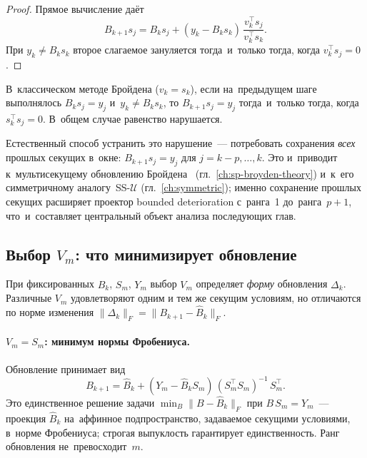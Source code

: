 \begin{proof}
Прямое вычисление даёт
\[
  B_{k+1} s_j
  = B_k s_j + (y_k - B_k s_k)\,\frac{v_k^\top s_j}{v_k^\top s_k}.
\]
При $y_k \neq B_k s_k$ второе слагаемое зануляется тогда~и~только тогда,
когда $v_k^\top s_j = 0$.
\end{proof}

\begin{corollary}\label{cor:broyden_destruction}
В~классическом методе Бройдена ($v_k = s_k$), если на~предыдущем шаге
выполнялось $B_k s_j = y_j$ и~$y_k \neq B_k s_k$, то $B_{k+1} s_j = y_j$
тогда~и~только тогда, когда $s_k^\top s_j = 0$. В~общем случае равенство нарушается.
\end{corollary}

Естественный способ устранить это нарушение~--- потребовать сохранения
\emph{всех} прошлых секущих в~окне: $B_{k+1} s_j = y_j$ для
$j=k{-}p,\ldots,k$. Это и~приводит к~мультисекущему обновлению
Бройдена~\cite{schnabel1983} (гл.~\ref{ch:sp-broyden-theory}) и~к~его
симметричному аналогу~SS-$\mathcal{U}$ (гл.~\ref{ch:symmetric}); именно
сохранение прошлых секущих расширяет проектор bounded deterioration
с~ранга~1 до~ранга~$p{+}1$, что~и~составляет центральный объект
анализа последующих глав.

\subsection*{Выбор $V_m$: что минимизирует обновление}

При фиксированных $\widehat{B}_k$, $S_m$, $Y_m$ выбор $V_m$ определяет
\emph{форму} обновления $\Delta_k$. Различные $V_m$ удовлетворяют
одним и тем же секущим условиям, но отличаются по норме изменения
$\|\Delta_k\|_F = \|B_{k+1} - \widehat{B}_k\|_F$.

\paragraph{$V_m = S_m$: минимум нормы Фробениуса.}
Обновление принимает вид
\begin{equation}\label{eq:Vm_Sm}
  B_{k+1} = \widehat{B}_k + (Y_m - \widehat{B}_k S_m)\,(S_m^\top S_m)^{-1}\,S_m^\top.
\end{equation}
Это единственное решение задачи $\min_{B}\|B - \widehat{B}_k\|_F$
при $B\,S_m = Y_m$~--- проекция $\widehat{B}_k$ на~аффинное подпространство,
задаваемое секущими условиями, в~норме Фробениуса; строгая выпуклость
гарантирует единственность. Ранг обновления не~превосходит~$m$.

